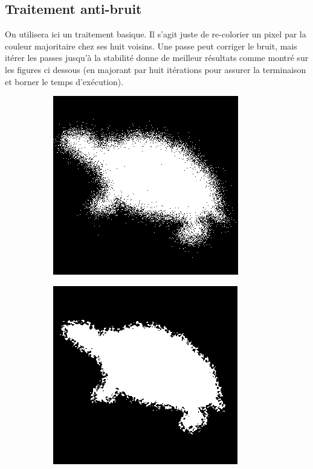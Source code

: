 \documentclass{article}
\theoremstyle{definition}
\begin{document}
    \subsection{Traitement anti-bruit}
    \label{sec:anti-bruit}
    
    On utilisera ici un traitement basique. Il s'agit juste de re-colorier un pixel par la couleur majoritaire chez ses huit voisins. Une passe peut corriger le bruit, mais itérer les passes jusqu'à la stabilité donne de meilleur résultats comme montré sur les figures ci dessous (en majorant par huit itérations pour assurer la terminaison et borner le temps d'exécution).
    
     \begin{figure}[!h]
	\centering
	  \begin{subfigure}{.24\textwidth}
	    \centering
	    \includegraphics[scale=0.3]{Illustrations/turtle-1-bruit.png}
	    \label{butterfly-rempli}
	  \end{subfigure}
	  \begin{subfigure}{.24\textwidth}
	    \centering
	    \includegraphics[scale=0.3]{Illustrations/turtle-1-bruit1.png}

\end{subfigure}
\end{figure}
\end{document}
